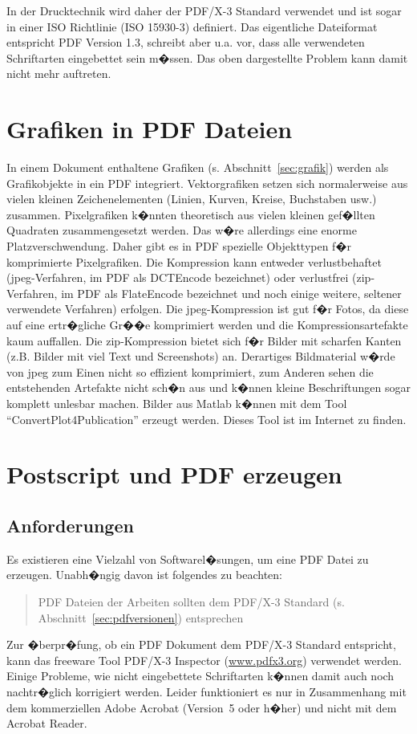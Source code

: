 In der Drucktechnik wird daher der PDF/X-3 Standard verwendet und ist sogar in einer ISO Richtlinie (ISO 15930-3) definiert. Das eigentliche Dateiformat entspricht PDF Version 1.3, schreibt aber u.a. vor, dass alle verwendeten Schriftarten eingebettet sein m�ssen. Das oben dargestellte Problem kann damit nicht mehr auftreten.

\section{Grafiken in PDF Dateien\label{sec:grafikenimpdf}}
In einem Dokument enthaltene Grafiken (s. Abschnitt~\ref{sec:grafik}) werden als Grafikobjekte in ein PDF integriert. Vektorgrafiken setzen sich normalerweise aus vielen kleinen Zeichenelementen (Linien, Kurven, Kreise, Buchstaben usw.) zusammen.
Pixelgrafiken k�nnten theoretisch aus vielen kleinen gef�llten Quadraten zusammengesetzt werden. Das w�re allerdings eine enorme Platzverschwendung. Daher gibt es in PDF spezielle Objekttypen f�r komprimierte Pixelgrafiken.
Die Kompression kann entweder verlustbehaftet (jpeg-Verfahren, im PDF als DCTEncode bezeichnet) oder verlustfrei (zip-Verfahren, im PDF als FlateEncode bezeichnet und noch einige weitere, seltener verwendete Verfahren) erfolgen. Die jpeg-Kompression ist gut f�r Fotos, da diese auf eine ertr�gliche Gr��e komprimiert werden und die Kompressionsartefakte kaum auffallen. Die zip-Kompression bietet sich f�r Bilder mit scharfen Kanten (z.B. Bilder mit viel Text und Screenshots) an. Derartiges Bildmaterial w�rde von jpeg zum Einen nicht so effizient komprimiert, zum Anderen sehen die entstehenden Artefakte nicht sch�n aus und k�nnen kleine Beschriftungen sogar komplett unlesbar machen. Bilder aus Matlab k�nnen mit dem Tool "`ConvertPlot4Publication"' erzeugt werden. Dieses Tool ist im Internet zu finden.

\section{Postscript und PDF erzeugen}
\subsection{Anforderungen}
Es existieren eine Vielzahl von Softwarel�sungen, um eine PDF
Datei zu erzeugen. Unabh�ngig davon ist folgendes zu beachten:
\begin{quote}
  PDF Dateien der Arbeiten sollten dem PDF/X-3 Standard (s. Abschnitt~\ref{sec:pdfversionen}) entsprechen
\end{quote}
Zur �berpr�fung, ob ein PDF Dokument dem PDF/X-3 Standard entspricht, kann das freeware Tool
PDF/X-3 Inspector (\url{www.pdfx3.org}) verwendet werden. Einige Probleme, wie nicht eingebettete
Schriftarten k�nnen damit auch noch nachtr�glich korrigiert werden. Leider funktioniert es nur in
Zusammenhang mit dem kommerziellen Adobe Acrobat (Version~5 oder h�her) und nicht mit dem Acrobat
Reader.

